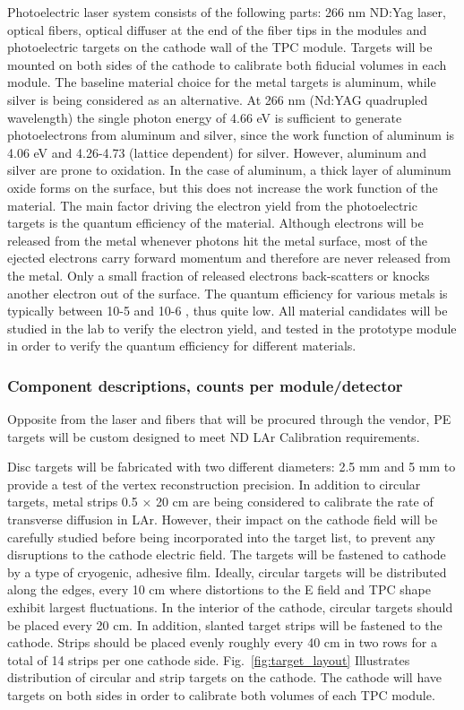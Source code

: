 Photoelectric laser system consists of the following parts: 266 nm ND:Yag laser, optical fibers, optical diffuser at the end of the fiber tips in the modules and photoelectric targets on the cathode wall of the TPC module. Targets will be mounted on both sides of the cathode to calibrate both fiducial volumes in each module.  The baseline material choice for the metal targets is aluminum, while silver is being considered as an alternative. At 266 nm (Nd:YAG quadrupled wavelength) the single photon energy of 4.66 eV is sufficient to generate photoelectrons from aluminum and silver, since the work function of aluminum is 4.06 eV and 4.26-4.73 (lattice dependent) for silver. However, aluminum and silver are prone to oxidation. In the case of aluminum, a thick layer of aluminum oxide forms on the surface, but this does not increase the work function of the material. The main factor driving the electron yield from the photoelectric targets is the quantum efficiency of the material. Although electrons will be released from the metal whenever photons hit the metal surface, most of the ejected electrons carry forward momentum and therefore are never released from the metal. Only a small fraction of released electrons back-scatters or knocks another electron out of the surface. The quantum efficiency for various metals is typically between 10-5 and 10-6 , thus quite low. All material candidates will be studied in the lab to verify the electron yield, and tested in the prototype module in order to verify the quantum efficiency for different materials.

\subsubsection{Component descriptions, counts per module/detector}
        
Opposite from the laser and fibers that will be procured through the vendor, PE targets will be custom designed to meet ND LAr Calibration requirements.
        
Disc targets will be fabricated with two different diameters: 2.5 mm and 5 mm to provide a test of the vertex reconstruction precision. In addition to circular targets, metal strips 0.5 × 20 cm are being considered to calibrate the rate of transverse diffusion in LAr. However, their impact on the cathode field will be carefully studied before being incorporated into the target list, to prevent any disruptions to the cathode electric field. The targets will be fastened to cathode by a type of cryogenic, adhesive film. Ideally, circular targets will be distributed along the edges, every 10 cm where distortions to the E field and TPC shape exhibit largest fluctuations. In the interior of the cathode, circular targets should be placed every 20 cm. In addition, slanted target strips will be fastened to the cathode. Strips should be placed evenly roughly every 40 cm in two rows for a total of 14 strips per one cathode side.  Fig.~\ref{fig:target_layout} Illustrates distribution of circular and strip targets on the cathode. The cathode will have targets on both sides in order to calibrate both volumes of each TPC module. 
        
